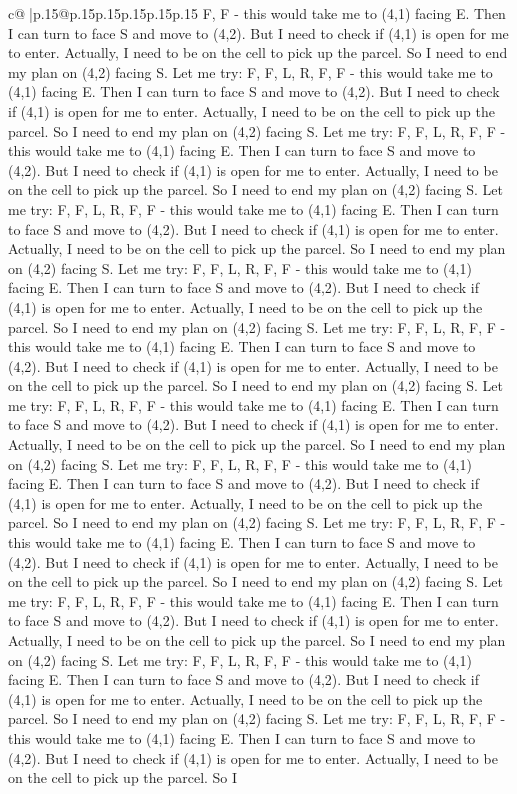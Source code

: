 \documentclass{article}
\begin{document}
{\begin{supertabular}{c@{$\;$}|p{.15\linewidth}@{}p{.15\linewidth}p{.15\linewidth}p{.15\linewidth}p{.15\linewidth}p{.15\linewidth}}
{{{F, F {-} this would take me to (4,1) facing E. Then I can turn to face S and move to (4,2). But I need to check if (4,1) is open for me to enter. Actually, I need to be on the cell to pick up the parcel. So I need to end my plan on (4,2) facing S. Let me try: F, F, L, R, F, F {-} this would take me to (4,1) facing E. Then I can turn to face S and move to (4,2). But I need to check if (4,1) is open for me to enter. Actually, I need to be on the cell to pick up the parcel. So I need to end my plan on (4,2) facing S. Let me try: F, F, L, R, F, F {-} this would take me to (4,1) facing E. Then I can turn to face S and move to (4,2). But I need to check if (4,1) is open for me to enter. Actually, I need to be on the cell to pick up the parcel. So I need to end my plan on (4,2) facing S. Let me try: F, F, L, R, F, F {-} this would take me to (4,1) facing E. Then I can turn to face S and move to (4,2). But I need to check if (4,1) is open for me to enter. Actually, I need to be on the cell to pick up the parcel. So I need to end my plan on (4,2) facing S. Let me try: F, F, L, R, F, F {-} this would take me to (4,1) facing E. Then I can turn to face S and move to (4,2). But I need to check if (4,1) is open for me to enter. Actually, I need to be on the cell to pick up the parcel. So I need to end my plan on (4,2) facing S. Let me try: F, F, L, R, F, F {-} this would take me to (4,1) facing E. Then I can turn to face S and move to (4,2). But I need to check if (4,1) is open for me to enter. Actually, I need to be on the cell to pick up the parcel. So I need to end my plan on (4,2) facing S. Let me try: F, F, L, R, F, F {-} this would take me to (4,1) facing E. Then I can turn to face S and move to (4,2). But I need to check if (4,1) is open for me to enter. Actually, I need to be on the cell to pick up the parcel. So I need to end my plan on (4,2) facing S. Let me try: F, F, L, R, F, F {-} this would take me to (4,1) facing E. Then I can turn to face S and move to (4,2). But I need to check if (4,1) is open for me to enter. Actually, I need to be on the cell to pick up the parcel. So I need to end my plan on (4,2) facing S. Let me try: F, F, L, R, F, F {-} this would take me to (4,1) facing E. Then I can turn to face S and move to (4,2). But I need to check if (4,1) is open for me to enter. Actually, I need to be on the cell to pick up the parcel. So I need to end my plan on (4,2) facing S. Let me try: F, F, L, R, F, F {-} this would take me to (4,1) facing E. Then I can turn to face S and move to (4,2). But I need to check if (4,1) is open for me to enter. Actually, I need to be on the cell to pick up the parcel. So I need to end my plan on (4,2) facing S. Let me try: F, F, L, R, F, F {-} this would take me to (4,1) facing E. Then I can turn to face S and move to (4,2). But I need to check if (4,1) is open for me to enter. Actually, I need to be on the cell to pick up the parcel. So I need to end my plan on (4,2) facing S. Let me try: F, F, L, R, F, F {-} this would take me to (4,1) facing E. Then I can turn to face S and move to (4,2). But I need to check if (4,1) is open for me to enter. Actually, I need to be on the cell to pick up the parcel. So I }}}
\end{supertabular}}
\end{document}
